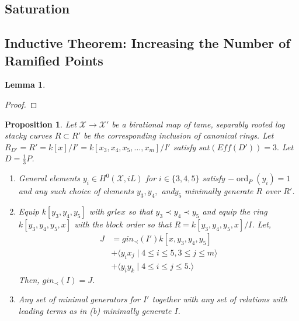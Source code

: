 \documentclass{amsart}
\theoremstyle{plain}
\newtheorem{prop}[thm]{Proposition}
\newtheorem{lem}[thm]{Lemma}
\theoremstyle{definition}
\theoremstyle{remark}
\numberwithin{equation}{section}
\newcommand\ssec{\subsection}
\newcommand \sx{\mathscr X}
\DeclareMathOperator{\ord}{ord}
\begin{document}
\ssec{Saturation}
\label{ssec:g_0_saturation}

\ssec{Inductive Theorem: Increasing the Number of Ramified Points}
\label{ssec:g_0_ram_pts}

\begin{lem}
\label{lem:minimal_quadratic}

\end{lem}
\begin{proof}

\end{proof}

\begin{prop}
\label{prop:sat_three_induction}
Let $\sx \rightarrow \sx'$ be a birational map of tame, separably rooted  log stacky curves $R \subset R'$ be the corresponding inclusion of canonical rings. Let $R_{D'} = R' = k[x]/I'= k[x_3,x_4,x_5,\ldots, x_m]/I'$ satisfy $sat(Eff(D')) = 3.$ Let $D = \frac{1}{3}P$. 
\begin{enumerate}
	\item[(a)] General elements  $y_i \in H^0(\sx,iL)$ for $i \in \{3,4,5\}$ satisfy $-\ord_P(y_i) = 1$ and any such choice of elements $y_3,y_4,$ and$ y_5$ minimally generate $R$ over $R'$.
	\item[(b)] Equip $k[y_3,y_4,y_5]$ with $grlex$ so that $y_3 \prec y_4 \prec y_5$ and equip the ring $k[y_3,y_4,y_5,x]$ with the block order so that $R = k[y_3,y_4,y_5,x]/I$. Let,
	\begin{align*}
	J &= gin_\prec(I')k[x,y_3,y_4,y_5] \\
	&+\langle y_i x_j \mid 4 \leq i \leq 5, 3 \leq j \leq m\rangle \\
	&+\langle y_iy_k \mid 4 \leq i \leq j \leq 5.\rangle 
\end{align*}
Then, $gin_\prec(I) = J$.
	\item[(c)] Any set of minimal generators for $I'$ together with any set of relations with leading terms as in (b) minimally generate $I$.
\end{enumerate}
\end{prop}
\end{document}
